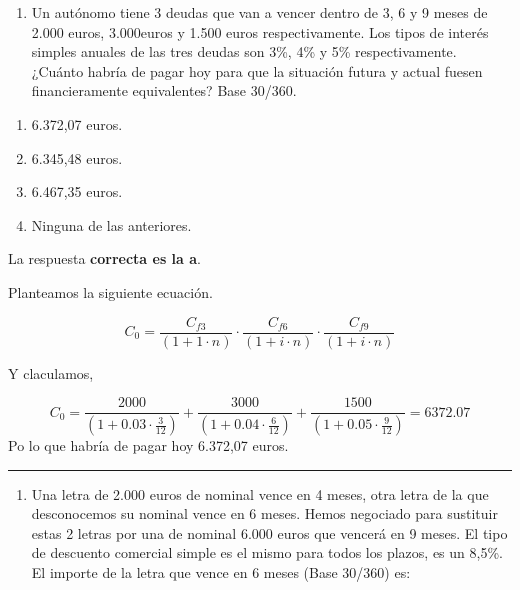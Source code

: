 \documentclass[
  letterpaper,
  DIV=11,
  numbers=noendperiod]{scrreprt}
\providecommand{\tightlist}{%
  \setlength{\itemsep}{0pt}\setlength{\parskip}{0pt}}\usepackage{longtable,booktabs,array}
\begin{document}
\begin{enumerate}
\def\labelenumi{\arabic{enumi}.}
\setcounter{enumi}{5}
\tightlist
\item
  Un autónomo tiene 3 deudas que van a vencer dentro de 3, 6 y 9 meses
  de 2.000 euros, 3.000euros y 1.500 euros respectivamente. Los tipos de
  interés simples anuales de las tres deudas son 3\%, 4\% y 5\%
  respectivamente. ¿Cuánto habría de pagar hoy para que la situación
  futura y actual fuesen financieramente equivalentes? Base 30/360.
\end{enumerate}

\begin{enumerate}
\def\labelenumi{\alph{enumi})}
\item
  6.372,07 euros.
\item
  6.345,48 euros.
\item
  6.467,35 euros.
\item
  Ninguna de las anteriores.
\end{enumerate}

\begin{tcolorbox}[enhanced jigsaw, left=2mm, opacityback=0, colback=white, breakable, arc=.35mm, bottomrule=.15mm, rightrule=.15mm, toprule=.15mm, leftrule=.75mm, colframe=quarto-callout-tip-color-frame]
\begin{minipage}[t]{5.5mm}
\textcolor{quarto-callout-tip-color}{\faLightbulb}
\end{minipage}%
\begin{minipage}[t]{\textwidth - 5.5mm}

La respuesta \textbf{correcta es la a}.

Planteamos la siguiente ecuación.

\[C_0=\frac{C_{f3}}{\left(1+1\cdot n\right)}\cdot\frac{C_{f6}}{\left(1+i\cdot n\right)}\cdot\frac{C_{f9}}{\left(1+i\cdot n\right)}\]

Y claculamos,

\[C_0=\frac{2000}{\left(1+0.03\cdot\frac{3}{12}\right)}+\frac{3000}{\left(1+0.04\cdot\frac{6}{12}\right)}+\frac{1500}{\left(1+0.05\cdot\frac{9}{12}\right)}=6372.07\]
Po lo que habría de pagar hoy 6.372,07 euros.

\end{minipage}%
\end{tcolorbox}

\begin{center}\rule{0.5\linewidth}{0.5pt}\end{center}

\begin{enumerate}
\def\labelenumi{\arabic{enumi}.}
\setcounter{enumi}{6}
\tightlist
\item
  Una letra de 2.000 euros de nominal vence en 4 meses, otra letra de la
  que desconocemos su nominal vence en 6 meses. Hemos negociado para
  sustituir estas 2 letras por una de nominal 6.000 euros que vencerá en
  9 meses. El tipo de descuento comercial simple es el mismo para todos
  los plazos, es un 8,5\%. El importe de la letra que vence en 6 meses
  (Base 30/360) es:
\end{enumerate}
\end{document}
